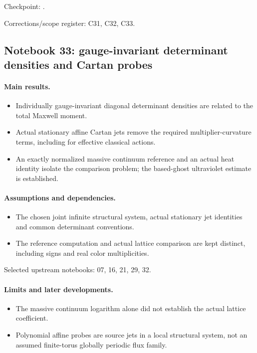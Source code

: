 \documentclass[11pt]{article}
\theoremstyle{remark}
\begin{document}
Checkpoint: .\par
Corrections/scope register: C31, C32, C33.\par

\subsection{Notebook 33: gauge-invariant determinant densities and Cartan probes}
\label{hnc-33}
\noindent{}\par

\paragraph{Main results.}
\begin{itemize}
\item Individually gauge-invariant diagonal determinant densities are related to the total Maxwell moment.
\item Actual stationary affine Cartan jets remove the required multiplier-curvature terms, including for effective classical actions.
\item An exactly normalized massive continuum reference and an actual heat identity isolate the comparison problem; the based-ghost ultraviolet estimate is established.
\end{itemize}

\paragraph{Assumptions and dependencies.}
\begin{itemize}
\item The chosen joint infinite structural system, actual stationary jet identities and common determinant conventions.
\item The reference computation and actual lattice comparison are kept distinct, including signs and real color multiplicities.
\end{itemize}

Selected upstream notebooks: 07, 16, 21, 29, 32.\par

\paragraph{Limits and later developments.}
\begin{itemize}
\item The massive continuum logarithm alone did not establish the actual lattice coefficient.
\item Polynomial affine probes are source jets in a local structural system, not an assumed finite-torus globally periodic flux family.
\end{itemize}
\end{document}
